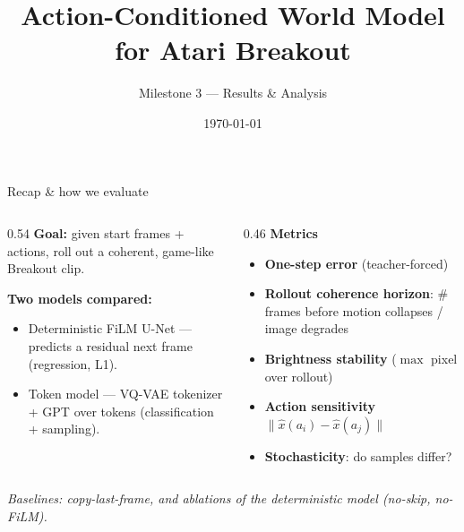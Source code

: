 \documentclass[aspectratio=169]{beamer}
\title[Breakout World Model: Results]{Action-Conditioned World Model for Atari Breakout}
\subtitle{Milestone 3 --- Results \& Analysis}
\author{}
\date{\today}
\begin{document}
\begin{frame}
  \titlepage
\end{frame}

\begin{frame}{Recap \& how we evaluate}
  \begin{columns}
    \begin{column}{0.54\textwidth}
      \textbf{Goal:} given start frames + actions, roll out a coherent,
      game-like Breakout clip.

      \vspace{0.4em}
      \textbf{Two models compared:}
      \begin{itemize}
        \item \textcolor{cDet}{Deterministic FiLM U-Net} — predicts a residual
              next frame (regression, L1).
        \item \textcolor{cTok}{Token model} — VQ-VAE tokenizer + GPT over tokens
              (classification + sampling).
      \end{itemize}
    \end{column}
    \begin{column}{0.46\textwidth}
      \textbf{Metrics}
      \begin{itemize}
        \item \textbf{One-step error} (teacher-forced)
        \item \textbf{Rollout coherence horizon}: \# frames before motion
              collapses / image degrades
        \item \textbf{Brightness stability} ($\max$ pixel over rollout)
        \item \textbf{Action sensitivity} $\|\hat{x}(a_i)-\hat{x}(a_j)\|$
        \item \textbf{Stochasticity}: do samples differ?
      \end{itemize}
    \end{column}
  \end{columns}
  \vspace{0.3em}
  \footnotesize\textit{Baselines: copy-last-frame, and ablations of the
  deterministic model (no-skip, no-FiLM).}
\end{frame}
\end{document}
